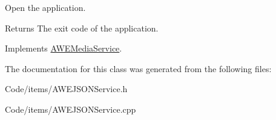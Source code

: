 Open the application. 

\begin{DoxyReturn}{Returns}
The exit code of the application. 
\end{DoxyReturn}


Implements \hyperlink{class_a_w_e_media_service_a3020cd2f0707a78005ab2ee6279ed122}{A\-W\-E\-Media\-Service}.



The documentation for this class was generated from the following files\-:\begin{DoxyCompactItemize}
\item 
Code/items/A\-W\-E\-J\-S\-O\-N\-Service.\-h\item 
Code/items/A\-W\-E\-J\-S\-O\-N\-Service.\-cpp\end{DoxyCompactItemize}

